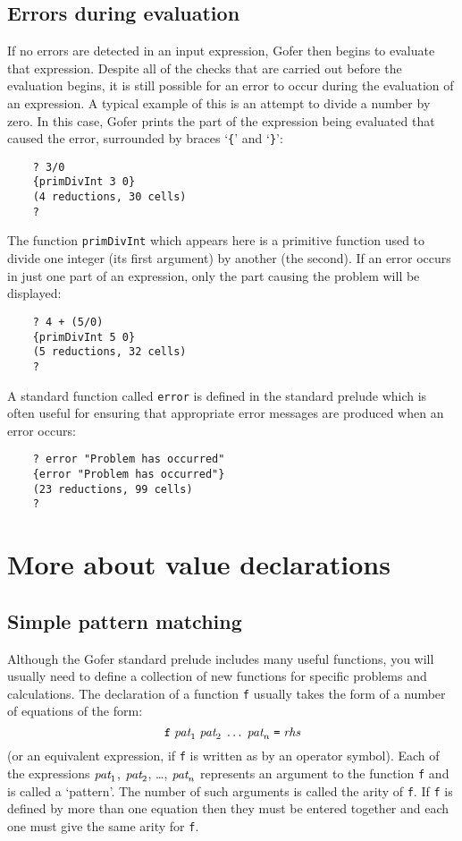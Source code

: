 \section{Errors during evaluation}
If no errors are detected in an input expression, Gofer then begins  to
evaluate that expression.  Despite all of the checks that  are  carried
out before the evaluation begins, it is still possible for an error  to
occur during the evaluation of an expression.   A  typical  example  of
this is an attempt to divide a number by zero.   In  this  case,  Gofer
prints the part of the  expression  being  evaluated  that  caused  the
error, surrounded by braces `\verb"{"' and `\verb"}"':
\begin{verbatim}
    ? 3/0
    {primDivInt 3 0}
    (4 reductions, 30 cells)
    ? 
\end{verbatim}
The function \verb"primDivInt" which appears here is a  primitive  function
used to divide  one  integer  (its  first  argument)  by  another  (the
second).  If an error occurs in just one part of  an  expression,
only the part causing the problem will be displayed:
\begin{verbatim}
    ? 4 + (5/0)
    {primDivInt 5 0}
    (5 reductions, 32 cells)
    ? 
\end{verbatim}
A standard function called \verb"error" is defined in the  standard  prelude
which is often useful for ensuring that appropriate error messages  are
produced when an error occurs:
\begin{verbatim}
    ? error "Problem has occurred"
    {error "Problem has occurred"}
    (23 reductions, 99 cells)
    ? 
\end{verbatim}

\chapter{More about value declarations}

\section{Simple pattern matching}
Although the Gofer standard prelude includes many useful functions, you
will usually need to define a collection of new functions for  specific
problems and calculations.  The declaration of a function  \verb"f"  usually
takes the form of a number of equations of the form:
\[
    \mbox{{\tt f}}\; \mbox{{\it pat}}_1\; \mbox{{\it pat}}_2\; \dots\; \mbox{{\it pat}}_n \;\mbox{{\tt =}}\; \mbox{{\it rhs}}
\]
(or an equivalent expression, if \verb"f"  is  written  as  by  an  operator
symbol).   Each  of  the  expressions  
$\mbox{{\it pat}}_1$, $\mbox{{\it pat}}_2$, \dots, $\mbox{{\it pat}}_n$
represents an argument to the function \verb"f" and is called  a  `pattern'.
The number of such arguments is called the arity of  \verb"f".
If  \verb"f"  is
defined by more than one equation then they must  be  entered  together
and each one must give the same arity for \verb"f".

